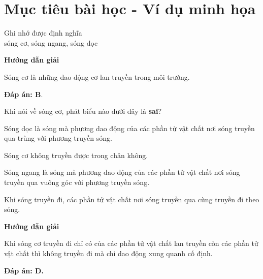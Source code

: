 \section{Mục tiêu bài học - Ví dụ minh họa}
\begin{dang}{Ghi nhớ được định nghĩa\\ sóng cơ, sóng ngang, sóng dọc}
	{
		\begin{center}
			\textbf{Hướng dẫn giải}
		\end{center}
		
		Sóng cơ là những dao động cơ lan truyền trong môi trường.
		
		
		\textbf{Đáp án: B}.
	}
	
	{
		Khi nói về sóng cơ, phát biểu nào dưới đây là \textbf{sai}?
		\begin{mcq}
			\item Sóng dọc là sóng mà phương dao động của các phần tử vật chất nơi sóng truyền qua trùng với phương truyền sóng.
			\item Sóng cơ không truyền được trong chân không.
			\item Sóng ngang là sóng mà phương dao động của các phần tử vật chất nơi sóng truyền qua vuông góc với phương truyền sóng.
			\item Khi sóng truyền đi, các phần tử vật chất nơi sóng truyền qua cùng truyền đi theo sóng.
		\end{mcq}
	}{
		\begin{center}
			\textbf{Hướng dẫn giải}
		\end{center}
		
		Khi sóng cơ truyền đi chỉ có  của các phần tử vật chất lan truyền còn các phần tử vật chất thì không truyền đi mà chỉ dao động xung quanh  cố định.
		
		\textbf{Đáp án: D.}
	}
	
\end{dang}
